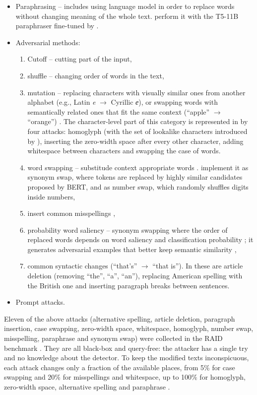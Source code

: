 \documentclass[W2, polski]{ThesisPLodz}
\let\cite\citep
\begin{document}
    \begin{itemize}
        \item Paraphrasing -- includes using language model in order to replace words without changing meaning of the whole text. \cite{dugan2024} perform it with the T5-11B paraphraser fine-tuned by \cite{krishna2023}.
        \item Adversarial methods:
        \begin{enumerate}
            \item Cutoff -- cutting part of the input,
            \item shuffle -- changing order of words in the text,
            \item mutation -- replacing characters with visually similar ones from another alphabet (e.g., Latin \textit{e} $\rightarrow$ Cyrillic \textit{е}), or swapping words with semantically related ones that fit the same context (``apple'' $\rightarrow$ ``orange'') \cite{liang2023}. The character-level part of this category is represented in \cite{dugan2024} by four attacks: homoglyph (with the set of lookalike characters introduced by \cite{wolff2020}), inserting the zero-width space after every other character, adding whitespace between characters and swapping the case of words.
            \item word swapping -- substitude context appropriate words \cite{shi2024}. \cite{dugan2024} implement it as synonym swap, where tokens are replaced by highly similar candidates proposed by BERT, and as number swap, which randomly shuffles digits inside numbers,
            \item insert common misspellings \cite{dugan2024},
            \item probability word saliency -- synonym swapping where the order of replaced words depends on word saliency and classification probability \cite{ren2019}; it generates adversarial examples that better keep semantic similarity \cite{wu2025},
            \item common syntactic changes (``that's'' $\rightarrow$ ``that is''). In \cite{dugan2024} these are article deletion (removing ``the'', ``a'', ``an''), replacing American spelling with the British one and inserting paragraph breaks between sentences.
        \end{enumerate}
        \item Prompt attacks.
    \end{itemize}
    Eleven of the above attacks (alternative spelling, article deletion, paragraph insertion, case swapping, zero-width space, whitespace, homoglyph, number swap, misspelling, paraphrase and synonym swap) were collected in the RAID benchmark \cite{dugan2024}. They are all black-box and query-free: the attacker has a single try and no knowledge about the detector. To keep the modified texts inconspicuous, each attack changes only a fraction of the available places, from 5\% for case swapping and 20\% for misspellings and whitespace, up to 100\% for homoglyph, zero-width space, alternative spelling and paraphrase \cite{dugan2024}.
\end{document}
